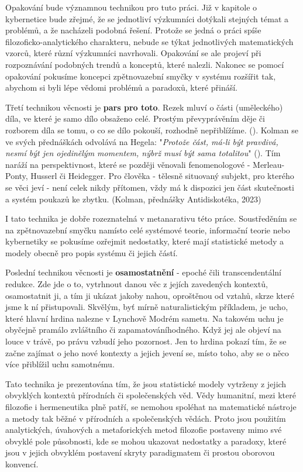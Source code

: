 \documentclass[11pt,a4paper]{article}
\begin{document}
Opakování bude významnou technikou pro tuto práci. Již v kapitole o kybernetice bude zřejmé, že se jednotliví výzkumníci dotýkali stejných témat a problémů, a že nacházeli podobná řešení. Protože se jedná o práci spíše filozoficko-analytického charakteru, nebude se týkat jednotlivých matematických vzorců, které různí výzkumníci navrhovali. Opakování se ale projeví při rozpoznávání podobných trendů a konceptů, které nalezli. Nakonec se pomocí opakování pokusíme koncepci zpětnovazební smyčky v systému rozšířit tak, abychom si byli lépe vědomi problémů a paradoxů, které přináší.  

Třetí technikou věcnosti je \textbf{pars pro toto}. Rezek mluví o části (uměleckého) díla, ve které je samo dílo obsaženo celé. Prostým převyprávěním děje či rozborem díla se tomu, o co se dílo pokouší, rozhodně nepřiblížíme. (\cite{rezek_telo_2010}). Kolman se ve svých přednáškách odvolává na Hegela: "\textit{Protože část, má-li být pravdivá, nesmí být jen ojedinělým momentem, nýbrž musí být sama totalitou}" (\cite{hegel_mala_1992}). Tím naráží na perspektivnost, které se později věnovali fenomenologové - Merleau-Ponty, Husserl či Heidegger. Pro člověka - tělesně situovaný subjekt, pro kterého se věci jeví -  není celek nikdy přítomen, vždy má k dispozici jen část skutečnosti a systém poukazů ke zbytku. (Kolman, přednášky Antidiskotéka, 2023)

I tato technika je dobře rozeznatelná v metanarativu této práce. Soustředěním se na zpětnovazební smyčku namísto celé systémové teorie, informační teorie nebo kybernetiky se pokusíme ozřejmit nedostatky, které mají statistické metody a modely obecně pro popis systému či jejich částí.

Poslední technikou věcnosti je \textbf{osamostatnění} - epoché čili transcendentální redukce. Zde jde o to, vytrhnout danou věc z jejích zavedených kontextů, osamostatnit ji, a tím ji ukázat jakoby nahou, oproštěnou od vztahů, skrze které jsme k ní přistupovali. Skvělým, byť mírně naturalistickým příkladem, je ucho, které hlavní hrdina nalezne v Lynchově Modrém sametu. Na takovém uchu je obyčejně pramálo zvláštního či zapamatováníhodného. Když jej ale objeví na louce v trávě, po právu vzbudí jeho pozornost. Jen to hrdina pokazí tím, že se začne zajímat o jeho nové kontexty a jejich jevení se, místo toho, aby se o něco více přiblížil uchu samotnému.

Tato technika je prezentována tím, že jsou statistické modely vytrženy z jejich obvyklých kontextů přírodních či společenských věd. Vědy humanitní, mezi které filozofie i hermeneutika plně patří, se nemohou spoléhat na matematické nástroje a metody tak běžné v přírodních a společenských vědách. Proto jsou použitím analytických, úvahových a metaforických metod filozofie postaveny mimo své obvyklé pole působnosti, kde se mohou ukazovat nedostatky a paradoxy, které jsou v jejich obvyklém postavení skryty paradigmatem či prostou oborovou konvencí.
\end{document}
